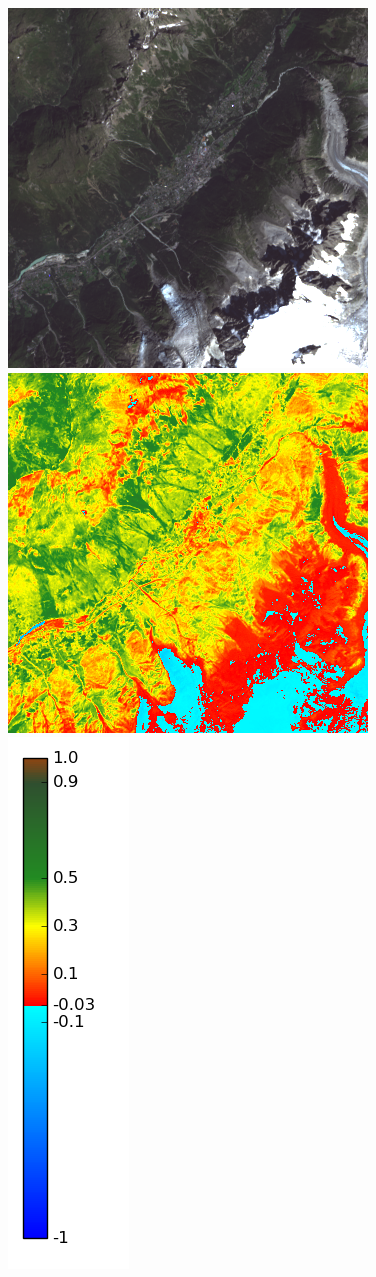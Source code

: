 \documentclass{book}
\begin{document}
\begin{figure}[H]
\centerline{
\includegraphics[scale=0.45]{images/Chamonix/08_rgb.png}
\includegraphics[scale=0.45]{images/Chamonix/08_ndvi.png}
\includegraphics[scale=0.4]{images/colormap.png}
}
\end{figure}
\end{document}
